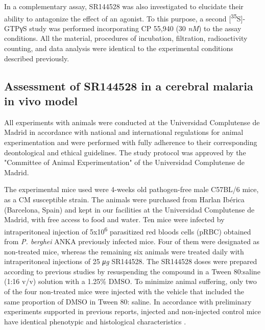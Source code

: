 \documentclass[empirical, authordate]{jote-new-article}
\begin{document}
In a complementary assay, SR144528 was also investigated to elucidate their ability to antagonize the effect of an agonist. To this purpose, a second [\textsuperscript{35}S]-GTPγS study was performed incorporating CP 55,940 (30 \emph{nM}) to the assay conditions. All the material, procedures of incubation, filtration, radioactivity counting, and data analysis were identical to the experimental conditions described previously.

\subsection{Assessment of SR144528 in a cerebral malaria in vivo model}

All experiments with animals were conducted at the Universidad Complutense de Madrid in accordance with national and international regulations for animal experimentation and were performed with fully adherence to their corresponding deontological and ethical guidelines. The study protocol was approved by the "Committee of Animal Experimentation" of the Universidad Complutense de Madrid.


The experimental mice used were 4-weeks old pathogen-free male C57BL/6 mice, as a CM susceptible strain. The animals were purchased from Harlan Ibérica (Barcelona, Spain) and kept in our facilities at the Universidad Complutense de Madrid, with free access to food and water. Ten mice were infected by intraperitoneal injection of 5x10\textsuperscript{6} parasitized red bloods cells (pRBC) obtained from \emph{P. berghei}\emph{\textbf{ }}ANKA previously infected mice. Four of them were designated as non-treated mice, whereas the remaining six animals were treated daily with intraperitoneal injections of 25 \emph{μg} SR144528. The SR144528 doses were prepared according to previous studies \parencite{Alferink2016} by resuspending the compound in a Tween 80:saline (1:16 v/v) solution with a 1.25\% DMSO. To minimize animal suffering, only two of the four non-treated mice were injected with the vehicle that included the same proportion of DMSO in Tween 80: saline. In accordance with preliminary experiments supported in previous reports, injected and non-injected control mice have identical phenotypic and histological characteristics \parencite{Marín-García2009}.
\end{document}
